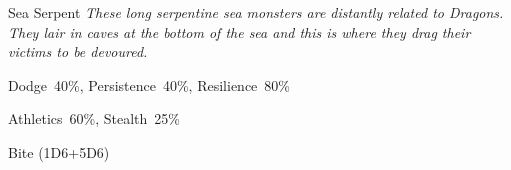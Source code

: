\begin{monsterbox}{Sea Serpent}
	\textit{These long serpentine sea monsters are distantly related to Dragons. They lair in caves at the bottom of the sea and this is where they drag their victims to be devoured.}\\
	\rpghline
	\basics[%
        hitpoints  = 36,
	majorwound = 18,
	damagemodifier = +5D6,
	powerpoints = 21,
	movementrate = {23m swimming, 0m in land},
	armor = Scales (5AP),
	plunderrating = 3
	]
	\rpghline%
	\stats[ %
		STR = 8D6+30 (58),
		CON = 4D6+21 (35),
		DEX = 2D6    (7),
		SIZ = 6D6+15 (36),
		INT = 3      (3),
		POW = 6D6    (21),
		CHA = 3      (3)
	]
	\rpghline%
	\begin{rpg-monsteraction}[Resistances]
		Dodge~40\%, Persistence~40\%, Resilience~80\%
	\end{rpg-monsteraction}
	\begin{rpg-monsteraction}[Practical]
		Athletics~60\%, Stealth~25\%
	\end{rpg-monsteraction}
	\begin{rpg-monsteraction}
		Bite (1D6+5D6)
	\end{rpg-monsteraction}

\end{monsterbox}

\newpage


